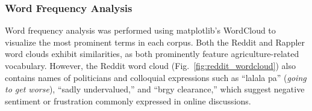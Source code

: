 \documentclass[conference]{IEEEtran}
\begin{document}





\subsubsection{Word Frequency Analysis}

Word frequency analysis was performed using matplotlib's WordCloud to visualize the most prominent terms in each corpus. 
Both the Reddit and Rappler word clouds exhibit similarities, as both prominently feature agriculture-related vocabulary. 
However, the Reddit word cloud (Fig.~\ref{fig:reddit_wordcloud}) also contains names of politicians and colloquial expressions such as ``lalala pa'' 
(\textit{going to get worse}), ``sadly undervalued,'' and ``brgy clearance,'' which suggest negative sentiment or frustration commonly expressed in online discussions.
\end{document}

